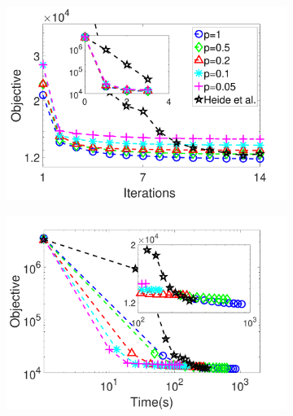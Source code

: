 \begin{figure}[h]
\centering
\begin{subfigure}{0.5\textwidth}
  \includegraphics[width=1\linewidth]{figure/iteVSobj.pdf}
\end{subfigure}

\begin{subfigure}{0.5\textwidth}
  \includegraphics[width=1\linewidth]{figure/timeVSobj.pdf}
\end{subfigure}


\end{figure}

